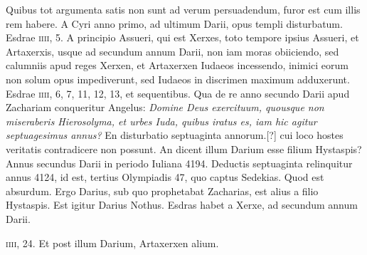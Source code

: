 \begin{parnumbers}
{}
\lnr{}Quibus tot argumenta satis non sunt ad verum persuadendum, furor est
cum illis rem habere.
\lnr{}A Cyri anno primo, ad ultimum Darii, opus
templi disturbatum.
\lnr{}Esdrae \textsc{iiii}, 5.
\lnr{}A principio Assueri, qui est
Xerxes, toto tempore ipsius Assueri, et Artaxerxis, usque ad secundum
annum Darii, non iam moras obiiciendo, sed calumniis apud
reges Xerxen, et Artaxerxen Iudaeos incessendo, inimici eorum
non solum opus impediverunt, sed Iudaeos in discrimen maximum
adduxerunt.
\lnr{}Esdrae \textsc{iiii}, 6, 7, 11, 12, 13, et sequentibus.
\lnr{}Qua de re
anno secundo Darii apud Zachariam conqueritur Angelus: \textit{Domine
Deus exercituum, quousque non miseraberis Hierosolyma, et
urbes Iuda, quibus iratus es, iam hic agitur septuagesimus annus?}
\lnr{}En disturbatio septuaginta annorum.[?] cui loco hostes veritatis contradicere
non possunt.
\lnr{}An dicent illum Darium esse filium Hystaspis?
\lnr{}Annus secundus Darii in periodo Iuliana 4194. Deductis septuaginta
relinquitur annus 4124, id est, tertius Olympiadis 47,
quo captus Sedekias.
\lnr{}Quod est absurdum.
\lnr{}Ergo Darius, sub quo
prophetabat Zacharias, est alius a filio Hystaspis.
\lnr{}Est igitur Darius
Nothus.
\lnr{}Esdras habet a Xerxe, ad secundum annum Darii.

\textsc{iiii}, 24.
\lnr{}Et post illum Darium, Artaxerxen alium.


\end{parnumbers}
